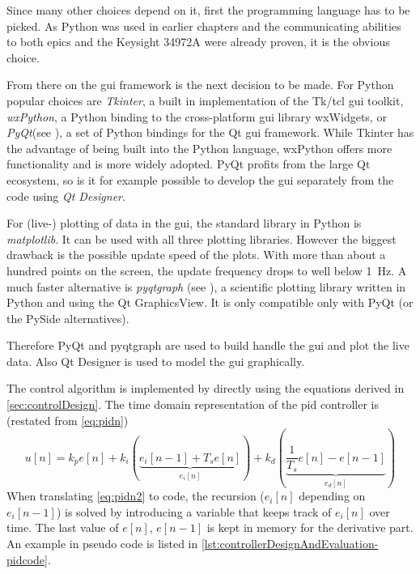 Since many other choices depend on it, first the programming language has to be picked. As Python was used in earlier chapters and the communicating abilities to both \gls{epics} and the Keysight 34972A were already proven, it is the obvious choice. 

From there on the \gls{gui} framework is the next decision to be made. For Python popular choices are \textit{Tkinter}, a built in implementation of the Tk/tcl \gls{gui} toolkit, \textit{wxPython}, a Python binding to the cross-platform \gls{gui} library wxWidgets, or \textit{PyQt}(see \cite{pyqt}), a set of Python bindings for the Qt \gls{gui} framework. \cite{qt} While Tkinter has the advantage of being built into the Python language, wxPython offers more functionality and is more widely adopted. PyQt profits from the large Qt ecosystem, so is it for example possible to develop the \gls{gui} separately from the code using \textit{Qt Designer}.

For (live-) plotting of data in the \gls{gui}, the standard library in Python is \textit{matplotlib}. \cite{Hunter2007} It can be used with all three plotting libraries. However the biggest drawback is the possible update speed of the plots. With more than about a hundred points on the screen, the update frequency drops to well below \SI{1}{\hertz}. A much faster alternative is \textit{pyqtgraph} (see \cite{pyqtgraph}), a scientific plotting library written in Python and using the Qt GraphicsView. It is only compatible only with PyQt (or the PySide alternatives).

Therefore PyQt and pyqtgraph are used to build handle the \gls{gui} and plot the live data. Also Qt Designer is used to model the \gls{gui} graphically.

The control algorithm is implemented by directly using the equations derived in \autoref{sec:controlDesign}. The time domain representation of the \gls{pid} controller is (restated from \autoref{eq:pidn})
\begin{equation}\label{eq:pidn2}
u[n] = k_p e[n] 
+ k_i \left(\underbrace{e_i[n-1] + T_s e[n]}_{e_i[n]}\right) 
+ k_d \left(\underbrace{\frac{1}{T_s} e[n]-e[n-1]}_{e_d[n]}\right)
\end{equation}
When translating \autoref{eq:pidn2} to code, the recursion ($e_i[n]$ depending on $e_i[n-1]$) is solved by introducing a variable that keeps track of $e_i[n]$ over time. The last value of $e[n]$, $e[n-1]$ is kept in memory for the derivative part.
An example in pseudo code is listed in \autoref{lst:controllerDesignAndEvaluation-pidcode}.

